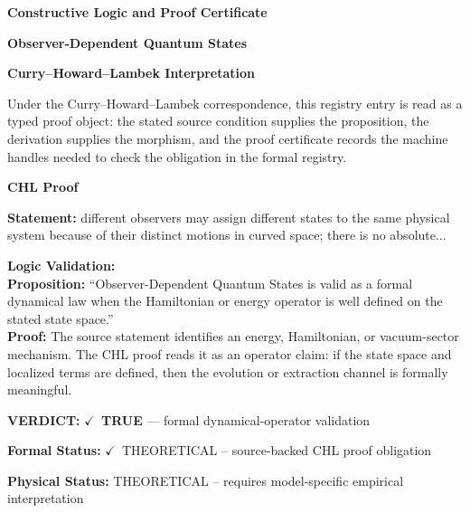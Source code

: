 \clearpage
\begingroup\tzpsupportsetup
\noindent\textbf{\fontsize{10.8pt}{12.8pt}\selectfont [ID 0064] Constructive Logic and Proof Certificate}\par
\noindent\textbf{\fontsize{10pt}{12pt}\selectfont Observer-Dependent Quantum States}\par
\vspace{0.45em}
\begingroup
\footnotesize
\setlength{\parskip}{0.22em}
\setlength{\parindent}{0pt}
\noindent\textbf{Curry--Howard--Lambek Interpretation}\par
Under the Curry--Howard--Lambek correspondence, this registry entry is read as a typed proof
object: the stated source condition supplies the proposition, the derivation supplies the
morphism, and the proof certificate records the machine handles needed to check the obligation
in the formal registry.

\vspace{0.45em}
\noindent\textbf{CHL Proof}\par
\textbf{Statement:} different observers may assign different states to the same physical system because of
their distinct motions in curved space; there is no absolute...

\textbf{Logic Validation:}\\
\textbf{Proposition:} ``Observer-Dependent Quantum States is valid as a formal dynamical law when the
Hamiltonian or energy operator is well defined on the stated state space.''\\
\textbf{Proof:} The source statement identifies an energy, Hamiltonian, or vacuum-sector mechanism. The
CHL proof reads it as an operator claim: if the state space and localized terms are
defined, then the evolution or extraction channel is formally meaningful.

\textbf{VERDICT:} \ensuremath{\checkmark}\ \textbf{TRUE} --- formal dynamical-operator validation

\textbf{Formal Status:} \ensuremath{\checkmark}\ THEORETICAL -- source-backed CHL proof obligation

\textbf{Physical Status:} THEORETICAL -- requires model-specific empirical interpretation
\par\vspace{0.45em}
\par
\ifTZPDarkEdition
{}
\fi
\endgroup
\endgroup
